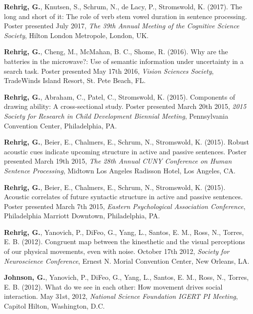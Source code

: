 \textbf{Rehrig, G.}, Knutsen, S., Schrum, N., de Lacy, P., Stromswold, K. (2017). The long and short of it: The role of verb stem vowel duration in sentence processing. Poster presented July  2017, \textit{The 39th Annual Meeting of the Cognitive Science Society}, Hilton London Metropole, London, UK.



\textbf{Rehrig, G.}, Cheng, M., McMahan, B. C., Shome, R. (2016). Why are the batteries in the microwave?: Use of semantic information under uncertainty in a search task. Poster presented May 17th 2016, \textit{Vision Sciences Society}, TradeWinds Island Resort, St. Pete Beach, FL.



\textbf{Rehrig, G.}, Abraham, C., Patel, C., Stromswold, K. (2015). Components of drawing ability: A cross-sectional study. Poster presented March 20th 2015, \textit{2015 Society for Research in Child Development Biennial Meeting}, Pennsylvania Convention Center, Philadelphia, PA.



\textbf{Rehrig, G.}, Beier, E., Chalmers, E., Schrum, N., Stromswold, K. (2015). Robust acoustic cues indicate upcoming structure in active and passive sentences. Poster presented March 19th 2015, \textit{The 28th Annual CUNY Conference on Human Sentence Processing}, Midtown Los Angeles Radisson Hotel, Los Angeles, CA.



\textbf{Rehrig, G.}, Beier, E., Chalmers, E., Schrum, N., Stromswold, K. (2015). Acoustic correlates of future syntactic structure in active and passive sentences. Poster presented March 7th 2015, \textit{Eastern Psychological Association Conference}, Philadelphia Marriott Downtown, Philadelphia, PA.



\textbf{Rehrig, G.}, Yanovich, P., DiFeo, G., Yang, L., Santos, E. M., Ross, N., Torres, E. B. (2012). Congruent map between the kinesthetic and the visual perceptions of our physical movements, even with noise. October 17th 2012, \textit{Society for Neuroscience Conference}, Ernest N. Morial Convention Center, New Orleans, LA.



\textbf{Johnson, G.}, Yanovich, P., DiFeo, G., Yang, L., Santos, E. M., Ross, N., Torres, E. B. (2012). What do we see in each other: How movement drives social interaction. May 31st, 2012, \textit{National Science Foundation IGERT PI Meeting}, Capitol Hilton, Washington, D.C.



